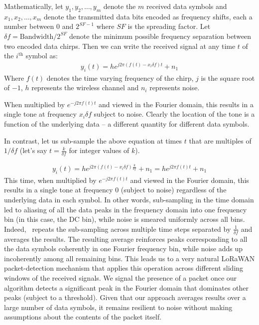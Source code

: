 Mathematically, let $y_1, y_2, \dots, y_m$ denote the $m$ received data symbols and $x_1, x_2, \dots, x_m$ denote the transmitted data bits encoded as frequency shifts, each a number between $0$ and $2^{SF-1}$ where $SF$ is the spreading factor. Let $\delta f = \text{Bandwidth} / 2^{SF}$ denote the minimum possible frequency separation between two encoded data chirps.  Then we can write the received signal at any time $t$ of the $i^{\text{th}}$ symbol as:
\begin{align}
    y_i(t) = h e^{j 2 \pi (f(t) - x_i \delta f) t} + n_1 \label{eqn:yi}
\end{align}
Where $f(t)$ denotes the time varying frequency of the chirp, $j$ is the square root of $-1$, $h$ represents the wireless channel and $n_i$ represents noise. 

When multiplied by $e^{-j 2 \pi f(t) t}$ and viewed in the Fourier domain, this results in a single tone at frequency $x_i \delta f$ subject to noise. Clearly the location of the tone is a function of the underlying data -- a different quantity for different data symbols. 

In contrast, let us sub-sample the above equation at times $t$ that are multiples of $1/\delta f$ (let's say $t = \frac{k}{\delta f}$ for integer values of $k$). 

\begin{align}
    y_i\left(t\right) = h e^{j 2 \pi (f(t) - x_i \delta f) \frac{k}{\delta f}} + n_1 = h e^{j 2 \pi f(t) t} + n_1\label{eqn:yi}
\end{align}
This time, when multiplied by $e^{-j 2 \pi f(t) t}$ and viewed in the Fourier domain, this results in a single tone at frequency $0$ (subject to noise) regardless of the underlying data in each symbol. In other words, sub-sampling in the time domain led to aliasing of all the data peaks in the frequency domain into one frequency bin (in this case, the DC bin), while noise is smeared uniformly across all bins. Indeed, \name\ repeats the sub-sampling across multiple time steps separated  by $\frac{1}{\delta f}$ and averages the results. The resulting average reinforces peaks corresponding to all the data symbols coherently in one Fourier frequency bin, while noise adds up incoherently among all remaining bins. This leads us to a very natural LoRaWAN packet-detection mechanism that applies this operation across different sliding windows of the received signals. We signal the presence of a packet once our algorithm detects a significant peak in the Fourier domain that dominates other peaks (subject to a threshold). Given that our approach averages results over a large number of data symbols, it remains resilient to noise without making assumptions about the contents of the packet itself.  \vspace*{0.1in}

